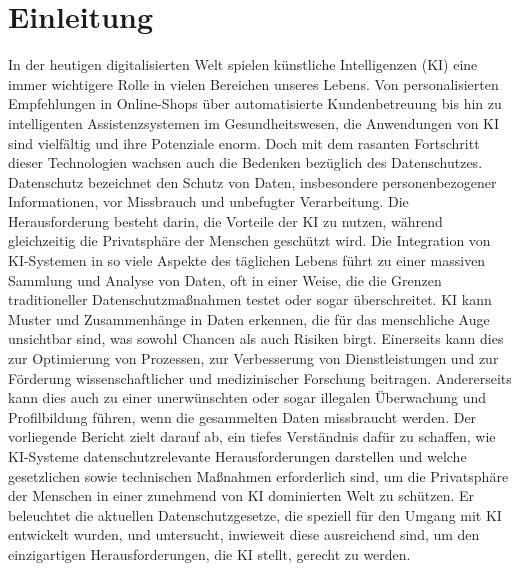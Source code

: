 \chapter{Einleitung}
In der heutigen digitalisierten Welt spielen künstliche Intelligenzen (KI) eine
immer wichtigere Rolle in vielen Bereichen unseres Lebens. Von personalisierten
Empfehlungen in Online-Shops über automatisierte Kundenbetreuung bis hin zu
intelligenten Assistenzsystemen im Gesundheitswesen, die Anwendungen von KI sind
vielfältig und ihre Potenziale enorm. Doch mit dem rasanten Fortschritt dieser
Technologien wachsen auch die Bedenken bezüglich des Datenschutzes. Datenschutz
bezeichnet den Schutz von Daten, insbesondere personenbezogener Informationen,
vor Missbrauch und unbefugter Verarbeitung. Die Herausforderung besteht darin,
die Vorteile der KI zu nutzen, während gleichzeitig die Privatsphäre der
Menschen geschützt wird. Die Integration von KI-Systemen in so viele Aspekte des
täglichen Lebens führt zu einer massiven Sammlung und Analyse von Daten, oft in
einer Weise, die die Grenzen traditioneller Datenschutzmaßnahmen testet oder
sogar überschreitet. KI kann Muster und Zusammenhänge in Daten erkennen, die für
das menschliche Auge unsichtbar sind, was sowohl Chancen als auch Risiken birgt.
Einerseits kann dies zur Optimierung von Prozessen, zur Verbesserung von
Dienstleistungen und zur Förderung wissenschaftlicher und medizinischer
Forschung beitragen. Andererseits kann dies auch zu einer unerwünschten oder
sogar illegalen Überwachung und Profilbildung führen, wenn die gesammelten Daten
missbraucht werden. Der vorliegende Bericht zielt darauf ab, ein tiefes
Verständnis dafür zu schaffen, wie KI-Systeme datenschutzrelevante
Herausforderungen darstellen und welche gesetzlichen sowie technischen Maßnahmen
erforderlich sind, um die Privatsphäre der Menschen in einer zunehmend von KI
dominierten Welt zu schützen. Er beleuchtet die aktuellen Datenschutzgesetze,
die speziell für den Umgang mit KI entwickelt wurden, und untersucht, inwieweit
diese ausreichend sind, um den einzigartigen Herausforderungen, die KI stellt,
gerecht zu werden. 
